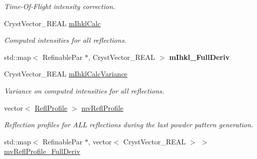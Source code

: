 \begin{DoxyCompactItemize}
\begin{DoxyCompactList}\small\item\em Time-\/\+Of-\/\+Flight intensity correction. \end{DoxyCompactList}\item 
\mbox{\label{class_obj_cryst_1_1_powder_pattern_diffraction_aa312a4468b704f0bad83f5d06d4f470e}} 
Cryst\+Vector\+\_\+\+R\+E\+AL \mbox{\hyperlink{class_obj_cryst_1_1_powder_pattern_diffraction_aa312a4468b704f0bad83f5d06d4f470e}{m\+Ihkl\+Calc}}
\begin{DoxyCompactList}\small\item\em Computed intensities for all reflections. \end{DoxyCompactList}\item 
\mbox{\label{class_obj_cryst_1_1_powder_pattern_diffraction_a714b65406fd491424c25be19e6b4897a}} 
std\+::map$<$ Refinable\+Par $\ast$, Cryst\+Vector\+\_\+\+R\+E\+AL $>$ {\bfseries m\+Ihkl\+\_\+\+Full\+Deriv}
\item 
\mbox{\label{class_obj_cryst_1_1_powder_pattern_diffraction_ac74d96cb164d11c48fa24acb73b28008}} 
Cryst\+Vector\+\_\+\+R\+E\+AL \mbox{\hyperlink{class_obj_cryst_1_1_powder_pattern_diffraction_ac74d96cb164d11c48fa24acb73b28008}{m\+Ihkl\+Calc\+Variance}}
\begin{DoxyCompactList}\small\item\em Variance on computed intensities for all reflections. \end{DoxyCompactList}\item 
\mbox{\label{class_obj_cryst_1_1_powder_pattern_diffraction_aaff1e7365e403358c95ffb916b5914e8}} 
vector$<$ \mbox{\hyperlink{struct_obj_cryst_1_1_powder_pattern_diffraction_1_1_refl_profile}{Refl\+Profile}} $>$ \mbox{\hyperlink{class_obj_cryst_1_1_powder_pattern_diffraction_aaff1e7365e403358c95ffb916b5914e8}{mv\+Refl\+Profile}}
\begin{DoxyCompactList}\small\item\em Reflection profiles for A\+LL reflections during the last powder pattern generation. \end{DoxyCompactList}\item 
std\+::map$<$ Refinable\+Par $\ast$, vector$<$ Cryst\+Vector\+\_\+\+R\+E\+AL $>$ $>$ \mbox{\hyperlink{class_obj_cryst_1_1_powder_pattern_diffraction_a41442a823c1633b37ab85b4bba910dd3}{mv\+Refl\+Profile\+\_\+\+Full\+Deriv}}

\end{DoxyCompactItemize}
